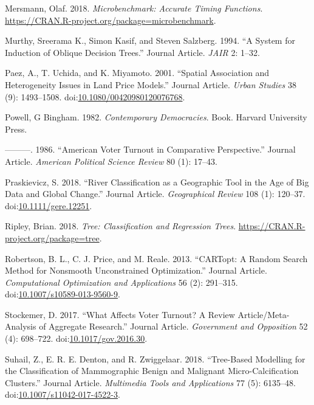\documentclass[]{elsarticle} %
\begin{document}
\hypertarget{ref-Mersmann2018}{}
Mersmann, Olaf. 2018. \emph{Microbenchmark: Accurate Timing Functions}.
\url{https://CRAN.R-project.org/package=microbenchmark}.

\hypertarget{ref-Murthy1994}{}
Murthy, Sreerama K., Simon Kasif, and Steven Salzberg. 1994. ``A System
for Induction of Oblique Decision Trees.'' Journal Article. \emph{JAIR}
2: 1--32.

\hypertarget{ref-Paez2001}{}
Paez, A., T. Uchida, and K. Miyamoto. 2001. ``Spatial Association and
Heterogeneity Issues in Land Price Models.'' Journal Article.
\emph{Urban Studies} 38 (9): 1493--1508.
doi:\href{https://doi.org/10.1080/00420980120076768}{10.1080/00420980120076768}.

\hypertarget{ref-Powell1982}{}
Powell, G Bingham. 1982. \emph{Contemporary Democracies}. Book. Harvard
University Press.

\hypertarget{ref-Powell1986}{}
---------. 1986. ``American Voter Turnout in Comparative Perspective.''
Journal Article. \emph{American Political Science Review} 80 (1):
17--43.

\hypertarget{ref-Praskievicz2018}{}
Praskievicz, S. 2018. ``River Classification as a Geographic Tool in the
Age of Big Data and Global Change.'' Journal Article. \emph{Geographical
Review} 108 (1): 120--37.
doi:\href{https://doi.org/10.1111/gere.12251}{10.1111/gere.12251}.

\hypertarget{ref-Ripley2018}{}
Ripley, Brian. 2018. \emph{Tree: Classification and Regression Trees}.
\url{https://CRAN.R-project.org/package=tree}.

\hypertarget{ref-Robertson2013}{}
Robertson, B. L., C. J. Price, and M. Reale. 2013. ``CARTopt: A Random
Search Method for Nonsmooth Unconstrained Optimization.'' Journal
Article. \emph{Computational Optimization and Applications} 56 (2):
291--315.
doi:\href{https://doi.org/10.1007/s10589-013-9560-9}{10.1007/s10589-013-9560-9}.

\hypertarget{ref-Stockemer2017}{}
Stockemer, D. 2017. ``What Affects Voter Turnout? A Review
Article/Meta-Analysis of Aggregate Research.'' Journal Article.
\emph{Government and Opposition} 52 (4): 698--722.
doi:\href{https://doi.org/10.1017/gov.2016.30}{10.1017/gov.2016.30}.

\hypertarget{ref-Suhail2018}{}
Suhail, Z., E. R. E. Denton, and R. Zwiggelaar. 2018. ``Tree-Based
Modelling for the Classification of Mammographic Benign and Malignant
Micro-Calcification Clusters.'' Journal Article. \emph{Multimedia Tools
and Applications} 77 (5): 6135--48.
doi:\href{https://doi.org/10.1007/s11042-017-4522-3}{10.1007/s11042-017-4522-3}.
\end{document}
